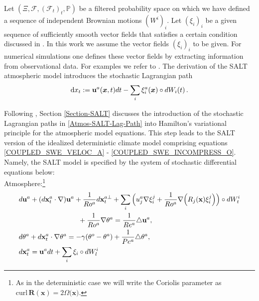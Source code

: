 \documentclass[11pt, oneside]{article}   	%
\numberwithin{equation}{section}
\theoremstyle{plain}
\theoremstyle{definition}
\theoremstyle{remark}
\newcommand{\<}{\langle}
\renewcommand{\>}{\rangle}
\def\U{{\bf u}}
\def\rmd{{\mathrm{d}}}
\newcommand{\bs}[1]{\boldsymbol{#1}}
\begin{document}
Let $(\Xi ,\mathcal{F},(\mathcal{F}_{t})_{t},\mathbb{P})$ be a filtered probability space on which we have defined a sequence of independent Brownian motions  $(W^{i})_{i}$. Let $(\xi_{i})_{i}$ be a given sequence of sufficiently smooth vector 
fields that satisfies a certain condition discussed in \cite{crisan2023implementation}. In this work we assume the vector fields $(\xi_{i})_{i}$
to be given. For numerical simulations one defines these vector fields by extracting information from observational data. For examples we refer to \cite{CCHOS18a,CCHOS18b}.
The derivation of the SALT atmospheric model introduces the stochastic Lagrangian path 
\begin{align}
{\rmd x_t} := \U^a(\bs{x},t)dt-\sum_i\xi_i^a(\bs{x})\circ dW_i(t)
\,.\label{Atmos-SALT-Lag-Path}
\end{align}


Following \cite{Holm2015}, Section \ref{Section-SALT} discusses the introduction of the stochastic Lagrangian paths in \eqref{Atmos-SALT-Lag-Path} into Hamilton's variational principle for the atmospheric model equations. This step  leads to the SALT version of the idealized deterministic climate model comprising equations \eqref{COUPLED_SWE_VELOC_A} - \eqref{COUPLED_SWE_INCOMPRESS_O}. Namely, the SALT model is specified by the system of stochastic differential equations below:\\[3mm]

\noindent
Atmosphere:\footnote{%
As in the deterministic case we will write the Coriolis parameter as $\mathrm{curl}\,\mathbf{R}(%
\mathbf{x})=2\Omega \mathbf{(x}).$}
\begin{align}
& d\mathbf{u}^{a}+(d\mathbf{x}_{t}^{a}\cdot \nabla )\mathbf{u}^{a}+\frac{1}{%
Ro^{a}}d\mathbf{x}_{t}^{a\bot }+{\sum_{i}\Big(u_{j}^{a}\nabla \xi
_{i}^{j}+\frac{1}{Ro^{a}}\nabla \Big(R_{j}\mathbf{(x})\xi _{i}^{j}\Big)\Big)%
\circ dW_{t}^{i}}  \notag \\
& \hspace{3cm}+\frac{1}{Ro^{a}}\nabla \theta ^{a}=\frac{1}{Re^{a}}\triangle 
\mathbf{u}^{a},  \label{COUPLED_SWE_VELOC_A_STOCH} \\
& d\theta ^{a}+d\mathbf{x}_{t}^{a}\cdot \nabla \theta ^{a}=-\gamma (\theta
^{o}-\theta ^{a})+\frac{1}{Pe^{a}}\triangle \theta ^{a},
\label{COUPLED_SWE_T_A_STOCH} \\
& d\mathbf{x}_{t}^{a}=\mathbf{u}^{a}dt+{\sum_{i}\xi _{i}\circ
dW_{l}^{i}}  \label{stochasticpath}
\end{align}
\end{document}
